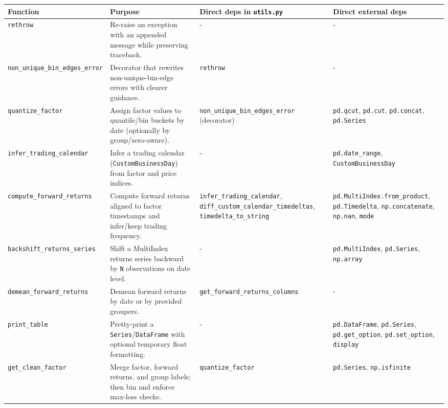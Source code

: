 \documentclass[11pt]{article}
\begin{document}
\small
\renewcommand{\arraystretch}{1.15}
\begin{center}
\begin{tabular}{>{\raggedright\arraybackslash}p{2.6cm} >{\raggedright\arraybackslash}p{3.8cm} >{\raggedright\arraybackslash}p{3.8cm} >{\raggedright\arraybackslash}p{4.0cm}}
\toprule
Function & Purpose & Direct deps in \texttt{utils.py} & Direct external deps \\
\midrule
\texttt{rethrow} & Re-raise an exception with an appended message while preserving traceback. & - & - \\
\texttt{non\_unique\_bin\_edges\_error} & Decorator that rewrites non-unique-bin-edge errors with clearer guidance. & \texttt{rethrow} & - \\
\texttt{quantize\_factor} & Assign factor values to quantile/bin buckets by date (optionally by group/zero-aware). & \texttt{non\_unique\_bin\_edges\_error} (decorator) & \texttt{pd.qcut}, \texttt{pd.cut}, \texttt{pd.concat}, \texttt{pd.Series} \\
\texttt{infer\_trading\_calendar} & Infer a trading calendar (\texttt{CustomBusinessDay}) from factor and price indices. & - & \texttt{pd.date\_range}, \texttt{CustomBusinessDay} \\
\texttt{compute\_forward\_returns} & Compute forward returns aligned to factor timestamps and infer/keep trading frequency. & \texttt{infer\_trading\_calendar}, \texttt{diff\_custom\_calendar\_timedeltas}, \texttt{timedelta\_to\_string} & \texttt{pd.MultiIndex.from\_product}, \texttt{pd.Timedelta}, \texttt{np.concatenate}, \texttt{np.nan}, \texttt{mode} \\
\texttt{backshift\_returns\_series} & Shift a MultiIndex returns series backward by \texttt{N} observations on date level. & - & \texttt{pd.MultiIndex}, \texttt{pd.Series}, \texttt{np.array} \\
\texttt{demean\_forward\_returns} & Demean forward returns by date or by provided groupers. & \texttt{get\_forward\_returns\_columns} & - \\
\texttt{print\_table} & Pretty-print a \texttt{Series}/\texttt{DataFrame} with optional temporary float formatting. & - & \texttt{pd.DataFrame}, \texttt{pd.Series}, \texttt{pd.get\_option}, \texttt{pd.set\_option}, \texttt{display} \\
\texttt{get\_clean\_factor} & Merge factor, forward returns, and group labels; then bin and enforce max-loss checks. & \texttt{quantize\_factor} & \texttt{pd.Series}, \texttt{np.isfinite} \\

\end{tabular}
\end{center}
\end{document}
